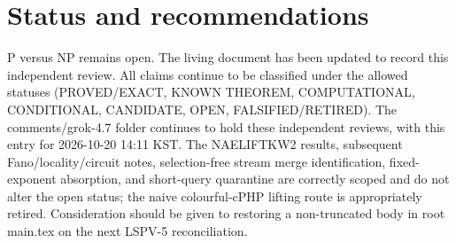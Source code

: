 \documentclass[11pt]{article}
\begin{document}
\section{Status and recommendations}
P versus NP remains open. The living document has been updated to record this independent review. All claims continue to be classified under the allowed statuses (PROVED/EXACT, KNOWN THEOREM, COMPUTATIONAL, CONDITIONAL, CANDIDATE, OPEN, FALSIFIED/RETIRED). The comments/grok-4.7 folder continues to hold these independent reviews, with this entry for 2026-10-20 14:11 KST. The NAELIFTKW2 results, subsequent Fano/locality/circuit notes, selection-free stream merge identification, fixed-exponent absorption, and short-query quarantine are correctly scoped and do not alter the open status; the naive colourful-cPHP lifting route is appropriately retired. Consideration should be given to restoring a non-truncated body in root main.tex on the next LSPV-5 reconciliation.

\end{document}
